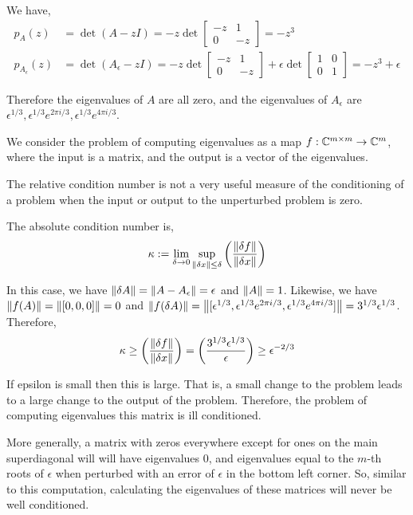 \documentclass[10pt]{article}
\begin{document}
\begin{solution}[Solution]
We have,
\begin{align*}
    p_A(z) &= \det(A-zI) = -z \det \left[\begin{array}{cc}-z & 1 \\ 0 & -z\end{array}\right] = -z^3 \\ 
        p_{A_{\epsilon}}(z) &= \det(A_{\epsilon}-zI) 
        = -z \det \left[\begin{array}{cc}-z & 1 \\ 0 & -z\end{array}\right] 
            + \epsilon \det \left[\begin{array}{cc}1&0\\0&1\end{array}\right]
        = -z^3 + \epsilon
\end{align*}

Therefore the eigenvalues of \( A \) are all zero, and the eigenvalues of \( A_{\epsilon} \) are \( \epsilon^{1/3}, \epsilon^{1/3}e^{2\pi i/3}, \epsilon^{1/3}e^{4 \pi i /3}  \).


We consider the problem of computing eigenvalues as a map \( f:\mathbb{C}^{m\times m} \to \mathbb{C}^m \), where the input is a matrix, and the output is a vector of the eigenvalues.

The relative condition number is not a very useful measure of the conditioning of a problem when the input or output to the unperturbed problem is zero.

The absolute condition number is,
\begin{align*}
    \kappa := \lim_{\delta \to 0} \sup_{\left\lVert\delta x\right\rVert\leq \delta } \left( \dfrac{\left\lVert\delta f\right\rVert}{\left\lVert\delta x\right\rVert} \right)
\end{align*}

In this case, we have \( \left\lVert\delta A\right\rVert = \left\lVert A-A_\epsilon\right\rVert = \epsilon \) and \( \left\lVert A\right\rVert = 1 \). Likewise, we have \( \left\lVert f(A)\right\rVert = \left\lVert[0,0,0]\right\rVert = 0 \) and \( \left\lVert f(\delta A)\right\rVert = \left\lVert[ \epsilon^{1/3}, \epsilon^{1/3}e^{2\pi i/3}, \epsilon^{1/3}e^{4 \pi i /3}  ]\right\rVert = 3^{1/3} \epsilon^{1/3} \). Therefore,
\begin{align*}
    \kappa \geq \left( \dfrac{\left\lVert\delta f\right\rVert}{\left\lVert\delta x\right\rVert} \right) 
    =\left( \dfrac{3^{1/3}\epsilon^{1/3}}{\epsilon} \right) \geq \epsilon^{-2/3}
\end{align*}


If epsilon is small then this is large. That is, a small change to the problem leads to a large change to the output of the problem. Therefore, the problem of computing eigenvalues this matrix is ill conditioned. 

More generally, a matrix with zeros everywhere except for ones on the main superdiagonal will will have eigenvalues 0, and eigenvalues equal to the \( m \)-th roots of \( \epsilon \) when perturbed with an error of \( \epsilon \) in the bottom left corner. So, similar to this computation, calculating the eigenvalues of these matrices will never be well conditioned.

\end{solution}
\end{document}
